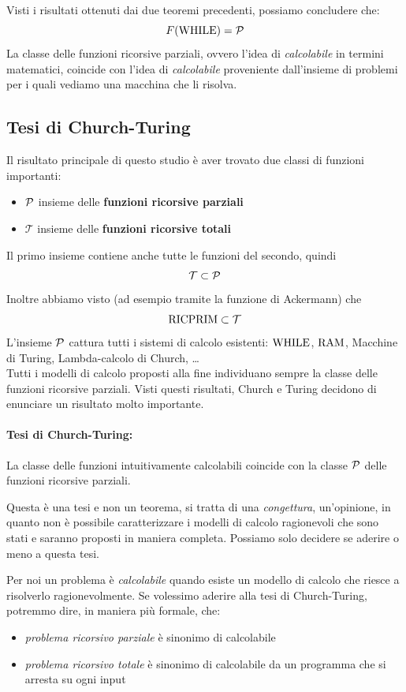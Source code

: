 Visti i risultati ottenuti dai due teoremi precedenti, possiamo concludere che: 
$$ F(\text{WHILE}) = \mathcal{P} $$
La classe delle funzioni ricorsive parziali, ovvero l'idea di \textit{calcolabile} in termini matematici, coincide con l'idea di \textit{calcolabile} proveniente dall'insieme di problemi per i quali vediamo una macchina che li risolva.\\

\subsection{Tesi di Church-Turing}
Il risultato principale di questo studio è aver trovato due classi di funzioni importanti: 
\begin{itemize}
	\item $\mathcal{P}$ insieme delle \textbf{funzioni ricorsive parziali}
	\item $\mathcal{T}$ insieme delle \textbf{funzioni ricorsive totali}
\end{itemize}

Il primo insieme contiene anche tutte le funzioni del secondo, quindi
$$ \mathcal{T} \subset \mathcal{P} $$
Inoltre abbiamo visto (ad esempio tramite la funzione di Ackermann) che
$$ \text{RICPRIM} \subset \mathcal{T} $$
L'insieme $\mathcal{P}$ cattura tutti i sistemi di calcolo esistenti: $\text{WHILE}$, $\text{RAM}$, Macchine di Turing, Lambda-calcolo di Church, \dots\\
Tutti i modelli di calcolo proposti alla fine individuano sempre la classe delle funzioni ricorsive parziali. Visti questi risultati, Church e Turing decidono di enunciare un risultato molto importante.

\paragraph{Tesi di Church-Turing:} La classe delle funzioni intuitivamente calcolabili coincide con la classe $\mathcal{P}$ delle funzioni ricorsive parziali.

Questa è una tesi e non un teorema, si tratta di una \textit{congettura}, un'opinione, in quanto non è possibile caratterizzare i modelli di calcolo ragionevoli che sono stati e saranno proposti in maniera completa. Possiamo solo decidere se aderire o meno a questa tesi.

Per noi un problema è \textit{calcolabile} quando esiste un modello di calcolo che riesce a risolverlo ragionevolmente. Se volessimo aderire alla tesi di Church-Turing, potremmo dire, in maniera più formale, che:
\begin{itemize}
	\item \textit{problema ricorsivo parziale} è sinonimo di calcolabile
	\item \textit{problema ricorsivo totale} è sinonimo di calcolabile da un programma che si arresta su ogni input
\end{itemize}

